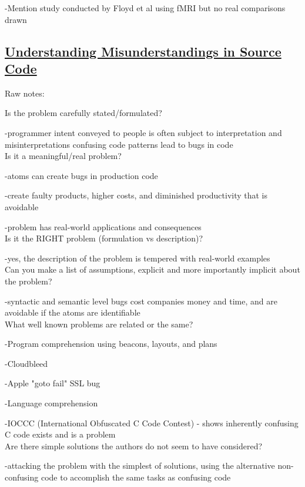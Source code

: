 \documentclass{IEEEtran}
\begin{document}
-Mention study conducted by Floyd et al using fMRI but no real comparisons drawn

\subsection{\underline{Understanding Misunderstandings in Source Code}\cite{gopstein_understanding_2017}}

Raw notes: 

Is the problem carefully stated/formulated?

-programmer intent conveyed to people is often subject to interpretation and misinterpretations confusing code patterns lead to bugs in code
\\

Is it a meaningful/real problem?

-atoms can create bugs in production code

-create faulty products, higher costs, and diminished productivity that is avoidable

-problem has real-world applications and consequences
\\

Is it the RIGHT problem (formulation vs description)?

-yes, the description of the problem is tempered with real-world examples
\\

Can you make a list of assumptions, explicit and more importantly implicit about the problem?

-syntactic and semantic level bugs cost companies money and time, and are avoidable if the atoms are identifiable
\\

What well known problems are related or the same?

-Program comprehension using beacons, layouts, and plans 

-Cloudbleed

-Apple "goto fail" SSL bug

-Language comprehension 

-IOCCC (International Obfuscated C Code Contest) - shows inherently confusing C code exists and is a problem
\\

Are there simple solutions the authors do not seem to have considered?

-attacking the problem with the simplest of solutions, using the alternative non-confusing code to accomplish the same
tasks as confusing code
\end{document}
